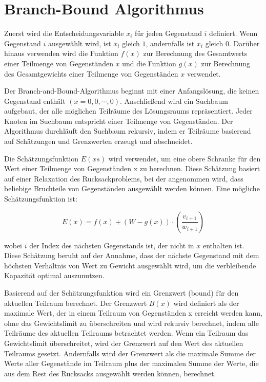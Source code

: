 \section{Branch-Bound Algorithmus}
Zuerst wird die Entscheidungsvariable $x_i$ für jeden 
Gegenstand $i$ definiert. Wenn Gegenstand $i$ ausgewählt wird, ist $x_i$ 
gleich $1$, andernfalls ist $x_i$ gleich $0$. Darüber hinaus 
verwenden wird die Funktion $f(x)$ zur Berechnung des 
Gesamtwerts einer Teilmenge von Gegenständen $x$ und die 
Funktion $g(x)$ zur Berechnung des Gesamtgewichts einer 
Teilmenge von Gegenständen $x$ verwendet.

Der Branch-and-Bound-Algorithmus beginnt mit einer 
Anfangslösung, die keinen Gegenstand enthält 
$(x = {0, 0, \cdots, 0})$. Anschließend wird ein Suchbaum 
aufgebaut, der alle möglichen Teilräume des Lösungsraums 
repräsentiert. Jeder Knoten im Suchbaum entspricht einer 
Teilmenge von Gegenständen. Der Algorithmus durchläuft den 
Suchbaum rekursiv, indem er Teilräume basierend auf 
Schätzungen und Grenzwerten erzeugt und abschneidet.

Die Schätzungsfunktion $E(xs)$ wird verwendet, um eine obere 
Schranke für den Wert einer Teilmenge von Gegenständen x zu 
berechnen. Diese Schätzung basiert auf einer Relaxation des 
Rucksackproblems, bei der angenommen wird, dass beliebige 
Bruchteile von Gegenständen ausgewählt werden können. Eine 
mögliche Schätzungsfunktion ist:

\begin{equation}
    E(x) = f(x) + (W - g(x)) \cdot \left(\frac{v_{i+1}}{w_{i+1}}\right)
\end{equation}

wobei $i$ der Index des nächsten Gegenstands ist, der nicht 
in $x$ enthalten ist. Diese Schätzung beruht auf der Annahme, 
dass der nächste Gegenstand mit dem höchsten Verhältnis von 
Wert zu Gewicht ausgewählt wird, um die verbleibende 
Kapazität optimal auszunutzen.

Basierend auf der Schätzungsfunktion wird ein Grenzwert 
(bound) für den aktuellen Teilraum berechnet. Der Grenzwert 
$B(x)$ wird definiert als der maximale Wert, der in einem 
Teilraum von Gegenständen x erreicht werden kann, ohne das 
Gewichtslimit zu überschreiten und wird 
rekursiv berechnet, indem alle Teilräume des aktuellen 
Teilraums betrachtet werden. Wenn ein Teilraum das 
Gewichtslimit überschreitet, wird der Grenzwert auf den Wert 
des aktuellen Teilraums gesetzt. Andernfalls wird der 
Grenzwert als die maximale Summe der Werte aller Gegenstände 
im Teilraum plus der maximalen Summe der Werte, die aus dem 
Rest des Rucksacks ausgewählt werden können, berechnet.

